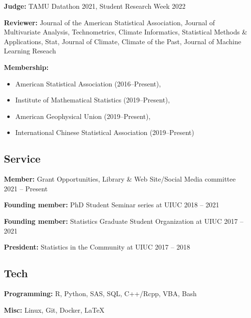 \documentclass[11pt]{article}
\begin{document}
\noindent \textbf{Judge:} TAMU Datathon 2021,  Student Research Week 2022

\noindent \textbf{Reviewer:} Journal of the American Statistical Association, Journal of Multivariate Analysis, Technometrics, Climate Informatics, Statistical Methods \& Applications, Stat, Journal of Climate, Climate of the Past, Journal of Machine Learning Reseach

\vspace{1mm}

\noindent \textbf{Membership:}
\begin{itemize}
\item American Statistical Association (2016--Present), 
\item Institute of Mathematical Statistics (2019--Present), 
\item American Geophysical Union (2019--Present), 
\item International Chinese Statistical Association (2019--Present)
\end{itemize}
\vspace{-1mm}


\subsection*{Service}
\vspace{-0.6cm}\noindent\hrulefill
\vspace{0.2cm}

\noindent \textbf{Member:} Grant Opportunities, Library \& Web Site/Social Media committee \hfill 2021 -- Present

\noindent \textbf{Founding member:} PhD Student Seminar series at UIUC \hfill 2018 -- 2021
\vspace{1mm}

\noindent \textbf{Founding member:} Statistics Graduate Student Organization at UIUC \hfill 2017 -- 2021
\vspace{1mm}

\noindent \textbf{President:} Statistics in the Community at UIUC \hfill 2017 -- 2018
\vspace{0mm}


\subsection*{Tech}
\vspace{-0.6cm}\noindent\hrulefill
\vspace{0.2cm}

\noindent \textbf{Programming:} R, Python, SAS, SQL, C++/Rcpp, VBA, Bash 
\vspace{1mm}

\noindent \textbf{Misc:} Linux, Git, Docker, \LaTeX
\end{document}
